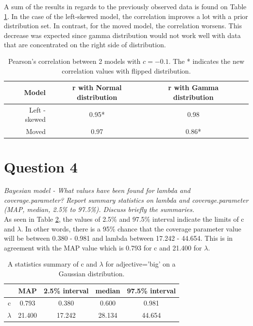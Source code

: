 \documentclass[11pt,a4paper,oneside]{article}
\begin{document}
A sum of the results in regards to the previously observed data is found on Table \ref{question_3_flipped}. In the case of the left-skewed model, the correlation improves a lot with a prior distribution set. In contrast, for the moved model, the correlation worsens. This decrease was expected since gamma distribution would not work well with data that are concentrated on the right side of distribution.

\begin{table}[ht]
\centering
\begin{tabular}{rccr}
  \hline
 Model & r with Normal distribution & r with Gamma distribution\\ 
  \hline
    Left - skewed & 0.95* & 0.98 \\ 
    Moved & 0.97 & 0.86* \\ 
   \hline
\end{tabular}
\caption{Pearson's correlation between 2 models with $c = -0.1$. The * indicates the new correlation values with flipped distribution.}
\label{question_3_flipped}
\end{table}

\section{Question 4}
\label{Q4}
\textit{Bayesian model - What values have been found for lambda and coverage.parameter? Report summary statistics on lambda and coverage.parameter (MAP, median, 2.5\% to 97.5\%). Discuss briefly the summaries.}\\

As seen in Table \ref{question_4},  the values of 2.5\% and 97.5\% interval indicate the limits of c and $\lambda$. In other words, there is a 95\% chance that the coverage parameter value will be between 0.380 - 0.981 and lambda between 17.242 - 44.654. This is in agreement with the MAP value which is 0.793 for c and 21.400 for $\lambda$.

\begin{table}[ht]
\centering
\begin{tabular}{ccccc}
  \hline
  & MAP & 2.5\% interval & median & 97.5\% interval\\ 
  \hline
    c & 0.793 & 0.380 & 0.600 & 0.981\\ 
    $\lambda$ & 21.400 & 17.242 & 28.134 & 44.654\\ 
   \hline
\end{tabular}
\caption{A statistics summary of c and $\lambda$ for adjective='big' on a Gaussian distribution.}
\label{question_4}
\end{table}
\end{document}
